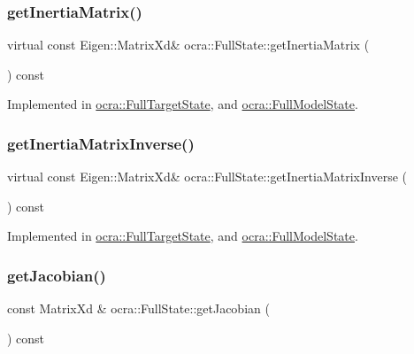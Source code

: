 \subsubsection{\texorpdfstring{get\+Inertia\+Matrix()}{getInertiaMatrix()}}
{\footnotesize\ttfamily virtual const Eigen\+::\+Matrix\+Xd\& ocra\+::\+Full\+State\+::get\+Inertia\+Matrix (\begin{DoxyParamCaption}{ }\end{DoxyParamCaption}) const\hspace{0.3cm}{\ttfamily [pure virtual]}}



Implemented in \hyperlink{classocra_1_1FullTargetState_ad7a1b06462ba3cc348e5634e1a0db0b2}{ocra\+::\+Full\+Target\+State}, and \hyperlink{classocra_1_1FullModelState_a988dec9567fd2b083ecfb6f3348d9a09}{ocra\+::\+Full\+Model\+State}.

\hypertarget{classocra_1_1FullState_a10f3a888554035bf13b3f636ce4b4edc}{}\label{classocra_1_1FullState_a10f3a888554035bf13b3f636ce4b4edc} 
\subsubsection{\texorpdfstring{get\+Inertia\+Matrix\+Inverse()}{getInertiaMatrixInverse()}}
{\footnotesize\ttfamily virtual const Eigen\+::\+Matrix\+Xd\& ocra\+::\+Full\+State\+::get\+Inertia\+Matrix\+Inverse (\begin{DoxyParamCaption}{ }\end{DoxyParamCaption}) const\hspace{0.3cm}{\ttfamily [pure virtual]}}



Implemented in \hyperlink{classocra_1_1FullTargetState_a55194b2f5683696eeee538cb93f3403a}{ocra\+::\+Full\+Target\+State}, and \hyperlink{classocra_1_1FullModelState_adf7ce7128a112c3f2b6367b6c0f6b9a2}{ocra\+::\+Full\+Model\+State}.

\hypertarget{classocra_1_1FullState_ada4a4e3af758b4af2ba95516eaad74e1}{}\label{classocra_1_1FullState_ada4a4e3af758b4af2ba95516eaad74e1} 
\subsubsection{\texorpdfstring{get\+Jacobian()}{getJacobian()}}
{\footnotesize\ttfamily const Matrix\+Xd \& ocra\+::\+Full\+State\+::get\+Jacobian (\begin{DoxyParamCaption}{ }\end{DoxyParamCaption}) const}




